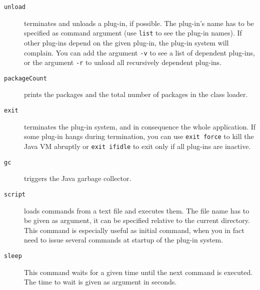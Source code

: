 \begin{description}
  
\item[\texttt{unload}]
  terminates and unloads a plug-in, if possible.
  The plug-in's name has to be specified as command argument (use
  \texttt{list} to see the plug-in names).
  If other plug-ins depend on the given plug-in, the plug-in system
  will complain.
  You can add the argument \texttt{-v} to see a list of
  dependent plug-ins, or the argument \texttt{-r} to unload all
  recursively dependent plug-ins.
\item[\texttt{packageCount}] prints the packages and the total number
  of packages in the class loader.
\item[\texttt{exit}]
  terminates the plug-in system, and in consequence the whole
  application.
  If some plug-in hangs during termination, you can use
  \texttt{exit force} to kill the Java VM abruptly or \texttt{exit ifidle} to exit only if all plug-ins are inactive.
\item[\texttt{gc}] triggers the Java garbage collector.
\item[\texttt{script}]
  loads commands from a text file and executes them.
  The file name has to be given as argument, it can be specified
  relative to the current directory.
  This command is especially useful as initial command, when you
  in fact need to issue several commands at startup of the plug-in
  system.
\item[\texttt{sleep}] This command waits for a given time until the next command is executed. The time to wait is given as argument in seconds.
\end{description}

